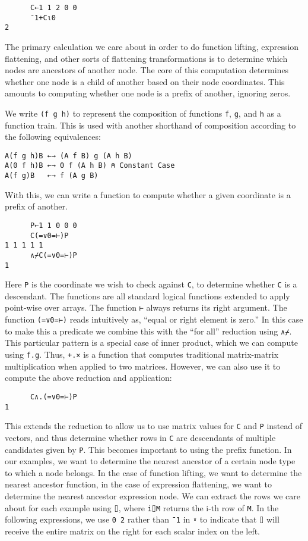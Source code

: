 \documentclass[numbers,preprint]{sigplanconf}
\begin{document}
\begin{verbatim}
      C←1 1 2 0 0
      ¯1+C⍳0
2
\end{verbatim}

The primary calculation we care about in order to do function lifting,
expression flattening, and other sorts of flattening transformations
is to determine which nodes are ancestors of another node. The core
of this computation determines whether one node is a child of another
based on their node coordinates. This amounts to computing whether
one node is a prefix of another, ignoring zeros.

We write \verb;(f g h); to represent the composition of functions \verb;f;, \verb;g;,
and \verb;h; as a function train. This is used with another shorthand of
composition according to the following equivalences:

\begin{verbatim}
A(f g h)B ←→ (A f B) g (A h B)
A(0 f h)B ←→ 0 f (A h B) ⍝ Constant Case
A(f g)B   ←→ f (A g B)
\end{verbatim}

With this, we can write a function to compute whether a given
coordinate is a prefix of another.

\begin{verbatim}
      P←1 1 0 0 0
      C(=∨0=⊢)P
1 1 1 1 1
      ∧⌿C(=∨0=⊢)P
1
\end{verbatim}

Here \verb;P; is the coordinate we wish to check against \verb;C;, to determine
whether \verb;C; is a descendant. The functions are all standard logical
functions extended to apply point-wise over arrays. The function
\verb;⊢; always returns its right argument. The function \verb;(=∨0=⊢);
reads intuitively as, ``equal or right element is zero.'' In this
case to make this a predicate we combine this with the ``for all''
reduction using \verb;∧⌿;. This particular pattern is a special case
of inner product, which we can compute using \verb;f.g;. Thus, \verb;+.×; is a
function that computes traditional matrix-matrix multiplication when
applied to two matrices. However, we can also use it to compute the
above reduction and application:
 
\begin{verbatim}
      C∧.(=∨0=⊢)P
1
\end{verbatim}

This extends the reduction to allow us to use matrix values for
\verb;C; and \verb;P; instead of vectors, and thus determine whether rows in \verb;C;
are descendants of multiple candidates given by \verb;P;. This becomes
important to using the prefix function. In our examples, we want
to determine the nearest ancestor of a certain node type to which a
node belongs. In the case of function lifting, we want to determine
the nearest ancestor function, in the case of expression flattening,
we want to determine the nearest ancestor expression node. We can
extract the rows we care about for each example using \verb;⌷;, where \verb;i⌷M;
returns the i-th row of \verb;M;. In the following expressions, we use \verb;0 2;
rather than \verb;¯1; in \verb;⍤; to indicate that \verb;⌷; will receive the entire
matrix on the right for each scalar index on the left.
\end{document}
